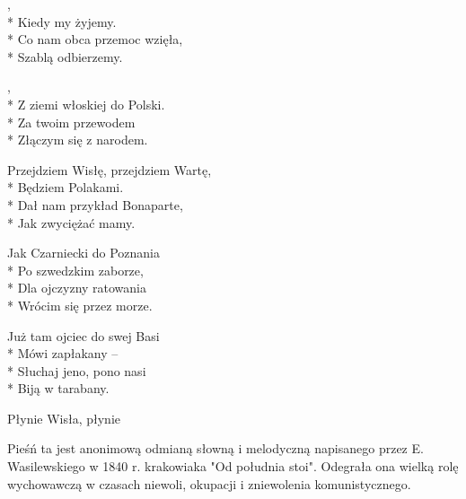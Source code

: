 \begin{lyrics}[longestline={Przejdziem Wisłę, przejdziem Wartę,}]

,\\*
Kiedy my żyjemy.\\*
Co nam obca przemoc wzięła,\\*
Szablą odbierzemy.

\begin{chorus}
,\\*
Z ziemi włoskiej do Polski.\\*
Za twoim przewodem\\*
Złączym się z narodem.
\end{chorus}

Przejdziem Wisłę, przejdziem Wartę,\\*
Będziem Polakami.\\*
Dał nam przykład Bonaparte,\\*
Jak zwyciężać mamy.

\chorusref

Jak Czarniecki do Poznania\\*
Po szwedzkim zaborze,\\*
Dla ojczyzny ratowania\\*
Wrócim się przez morze.

\chorusref

Już tam ojciec do swej Basi\\*
Mówi zapłakany --\\*
Słuchaj jeno, pono nasi\\*
Biją w tarabany.

\chorusref
\end{lyrics}



\song
{Płynie Wisła, płynie}
\begin{info}Pieśń ta jest anonimową odmianą słowną i melodyczną napisanego przez E. Wasilewskiego w 1840 r. krakowiaka "Od południa stoi". Odegrała ona wielką rolę wychowawczą w czasach niewoli, okupacji i zniewolenia komunistycznego.\end{info}

